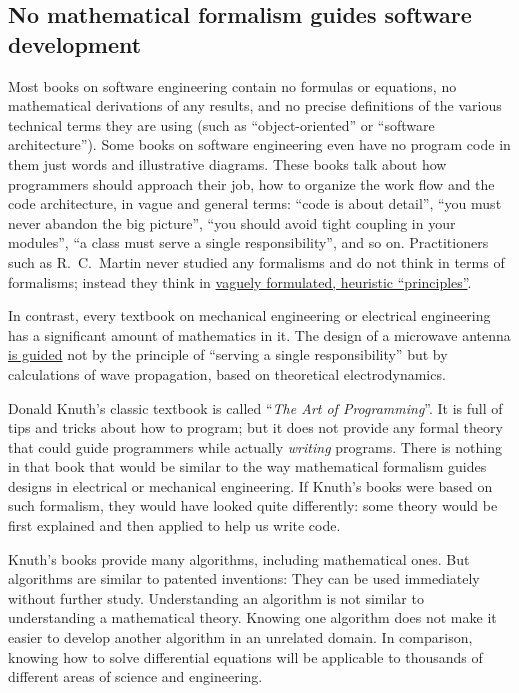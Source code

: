\subsection{No mathematical formalism guides software development}

Most books on software engineering contain no formulas or equations,
no mathematical derivations of any results, and no precise definitions
of the various technical terms they are using (such as ``object-oriented''
or ``software architecture''). Some books on software engineering
even have no program code in them \textendash{} just words and illustrative
diagrams. These books talk about how programmers should approach their
job, how to organize the work flow and the code architecture, in vague
and general terms: ``code is about detail'', ``you must never abandon
the big picture'', ``you should avoid tight coupling in your modules'',
``a class must serve a single responsibility'', and so on. Practitioners
such as R.\ C.\ Martin never studied any formalisms and do not think
in terms of formalisms; instead they think in \href{https://blog.cleancoder.com/uncle-bob/2016/03/19/GivingUpOnTDD.html}{vaguely formulated, heuristic \textquotedblleft principles\textquotedblright}.

In contrast, every textbook on mechanical engineering or electrical
engineering has a significant amount of mathematics in it. The design
of a microwave antenna \href{https://www.youtube.com/watch?v=46SbGxS73dY}{is guided}
not by the principle of ``serving a single responsibility'' but
by calculations of wave propagation, based on theoretical electrodynamics.

Donald Knuth's classic textbook is called ``\emph{The Art of Programming}''.
It is full of tips and tricks about how to program; but it does not
provide any formal theory that could guide programmers while actually
\emph{writing} programs. There is nothing in that book that would
be similar to the way mathematical formalism guides designs in electrical
or mechanical engineering. If Knuth's books were based on such formalism,
they would have looked quite differently: some theory would be first
explained and then applied to help us write code.

Knuth's books provide many algorithms, including mathematical ones.
But algorithms are similar to patented inventions: They can be used
immediately without further study. Understanding an algorithm is not
similar to understanding a mathematical theory. Knowing one algorithm
does not make it easier to develop another algorithm in an unrelated
domain. In comparison, knowing how to solve differential equations
will be applicable to thousands of different areas of science and
engineering.

